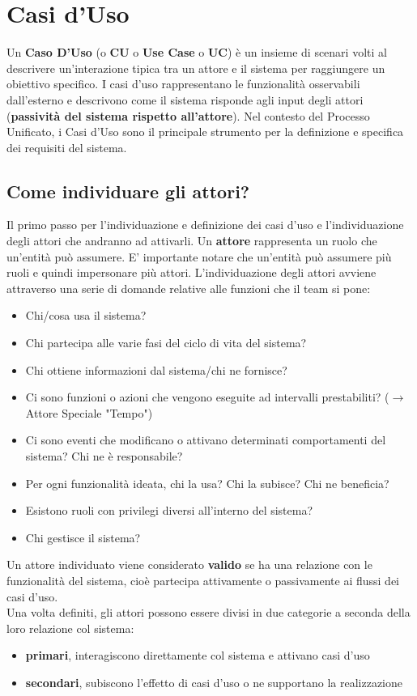 \section{Casi d'Uso}
\label{concept:casi-duso}
Un \textbf{Caso D'Uso} (o \textbf{CU} o \textbf{Use Case} o \textbf{UC}) è un insieme di scenari volti al descrivere un'interazione tipica tra un {attore} e il sistema per raggiungere un obiettivo specifico. I casi d'uso rappresentano le funzionalità osservabili dall'esterno e descrivono come il sistema risponde agli input degli attori (\textbf{passività del sistema rispetto all'attore}). Nel contesto del Processo Unificato, i Casi d'Uso sono il principale strumento per la definizione e specifica dei {requisiti} del sistema. 
\subsection{Come individuare gli attori?}
\label{individuazione-attori}
Il primo passo per l'individuazione e definizione dei casi d'uso e l'individuazione degli {attori} che andranno ad attivarli. Un \textbf{attore} rappresenta un ruolo che un'entità può assumere. E' importante notare che un'entità può assumere più ruoli e quindi impersonare più attori. L'individuazione degli attori avviene attraverso una serie di domande relative alle funzioni che il team si pone:
\begin{itemize}
    \item Chi/cosa usa il sistema?
    \item Chi partecipa alle varie fasi del ciclo di vita del sistema?
    \item Chi ottiene informazioni dal sistema/chi ne fornisce?
    \item Ci sono funzioni o azioni che vengono eseguite ad intervalli prestabiliti? ($\rightarrow$ Attore Speciale "Tempo") 
    \item Ci sono eventi che modificano o attivano determinati comportamenti del sistema? Chi ne è responsabile?
    \item Per ogni funzionalità ideata, chi la usa? Chi la subisce? Chi ne beneficia?
    \item Esistono ruoli con privilegi diversi all'interno del sistema?
    \item Chi gestisce il sistema?
\end{itemize}
Un attore individuato viene considerato \textbf{valido} se ha una relazione con le funzionalità del sistema, cioè partecipa attivamente o passivamente ai flussi dei casi d'uso. \\
Una volta definiti, gli attori possono essere divisi in due categorie a seconda della loro relazione col sistema:
\begin{itemize}
    \item \textbf{primari}, interagiscono direttamente col sistema e attivano casi d'uso
    \item \textbf{secondari}, subiscono l'effetto di casi d'uso o ne supportano la realizzazione
\end{itemize}
